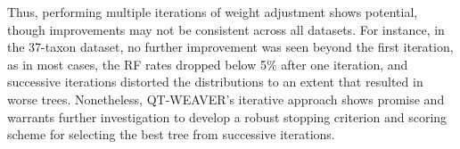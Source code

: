 \documentclass[runningheads]{llncs}
\begin{document}


Thus, performing multiple iterations of weight adjustment shows potential, though improvements may not be consistent across all datasets. For instance, in the 37-taxon dataset, no further improvement was seen beyond the first iteration, as in most cases, the RF rates dropped below 5\% after one iteration, and successive iterations distorted the distributions to an extent that resulted in worse trees. Nonetheless, QT-WEAVER’s iterative approach shows promise and warrants further investigation to develop a robust stopping criterion and scoring scheme for selecting the best tree from successive iterations.
\end{document}
